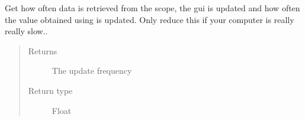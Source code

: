 \documentclass[letterpaper,10pt,english]{sphinxmanual}
\begin{document}
\begin{fulllineitems}
\begin{fulllineitems}
\begin{quote}
\begin{description}
\end{description}\end{quote}

\end{fulllineitems}


\begin{fulllineitems}
\label{\detokenize{index:TiePieLCR_settings.TiePieLCR_settings.get_update_frequency}}
\sphinxAtStartPar
Get how often data is retrieved from the scope, the gui is updated and how often the value obtained using  is updated. Only reduce this if your computer is really really slow..
\begin{quote}\begin{description}
\item[{Returns}] \leavevmode
\sphinxAtStartPar
The update frequency

\item[{Return type}] \leavevmode
\sphinxAtStartPar
Float

\end{description}\end{quote}

\end{fulllineitems}


\begin{fulllineitems}
\label{\detokenize{index:TiePieLCR_settings.TiePieLCR_settings.impedance_format}}
\end{fulllineitems}


\begin{fulllineitems}
\label{\detokenize{index:TiePieLCR_settings.TiePieLCR_settings.impedance_format_label1}}
\end{fulllineitems}


\end{fulllineitems}
\end{document}
